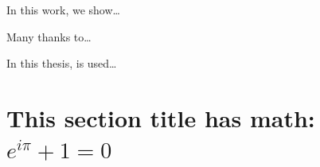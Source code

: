 \documentclass{UMassThesis14}
\begin{document}


\PrintTitlePage
\PrintCopyrightPage
\PrintSignaturetPage



\begin{UMBAbstract}
In this work, we show\ldots
\end{UMBAbstract}

\newpage


\doublespacing
Many thanks to\ldots

\newpage
\PrintToCLoFLoT

\SetUpMainText


% 


\label{ch:introduction}

In this thesis, \cite{delone_1985} is used\ldots


\section{This section title has math: $e^{i\pi}+1=0$}
\label{sec:section_example}
\end{document}
